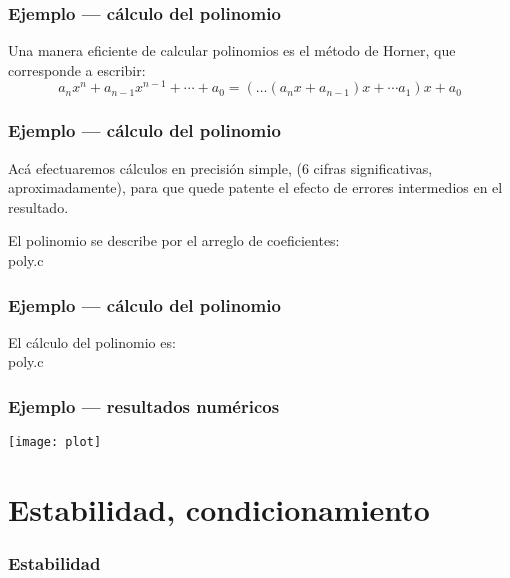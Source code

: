\documentclass[english, spanish, fleqn,%
hyperref = {colorlinks, urlcolor = blue}%
]{beamer}
\begin{document}
\begin{frame}
  \frametitle{Ejemplo --- cálculo del polinomio}

  Una manera eficiente de calcular polinomios es el método de Horner,
  que corresponde a escribir:
  \begin{equation*}
    a_n x^n + a_{n - 1} x^{n - 1} + \dotsb + a_0
      = (\dotsc (a_n x + a_{n - 1}) x + \dotsb a_1) x + a_0
  \end{equation*}
\end{frame}

\begin{frame}[fragile]
  \frametitle{Ejemplo --- cálculo del polinomio}

  Acá efectuaremos cálculos en precisión simple,
  (6 cifras significativas,
   aproximadamente),
  para que quede patente el efecto de errores intermedios en el resultado.

  El polinomio se describe por el arreglo de coeficientes:
  \\[0.5ex]
  
                  {poly.c}
\end{frame}

\begin{frame}[fragile]
  \frametitle{Ejemplo --- cálculo del polinomio}

  El cálculo del polinomio es:
  \\[0.5ex]
  
                  {poly.c}
\end{frame}

\begin{frame}
  \frametitle{Ejemplo --- resultados numéricos}

  \texttt{[image: plot]}

\end{frame}

\section{Estabilidad, condicionamiento}

\begin{frame}
  \setcounter{beamerpauses}{2}
  \frametitle{Estabilidad}


\end{frame}
\end{document}

